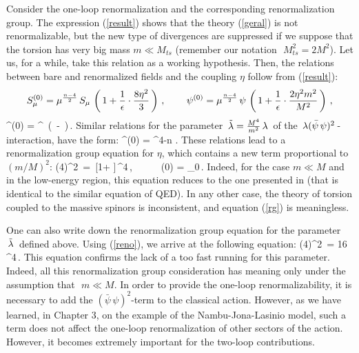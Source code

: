 Consider the one-loop renormalization and the corresponding
renormalization group. 
The expression (\ref{result}) shows that the theory (\ref{geral})
is not renormalizable, but the new type of divergences are 
suppressed if we suppose that the torsion has very big mass
$m \ll M_{ts}$ (remember our notation $\,\,M^2_{ts}=2M^2$). 
Let us, for a while, take this relation as a 
working hypothesis. Then, the relations between bare
and renormalized fields and the coupling $\eta$ follow from
(\ref{result}):
$$
S_\mu^{(0)} = \mu^{\frac{n-4}{2}}\,S_\mu\,
\left(\, 1 + \frac{1}{\epsilon}\cdot\frac{8\eta^2}{3}\,\right)
\,,\,\,\,\,\,\,\,\,\,\,\,\,\, \psi^{(0)} =
\mu^{\frac{n-4}{2}}\,\psi\, \left(\, 1 +
\frac{1}{\epsilon}\cdot\frac{2\eta^2m^2}{M^2}\,\right)\,,
$$
\beq
\eta^{(0)} = \mu^{}\, \left( \,\eta -
\cdot {}\cdot {}\,\right)\,. \label{renor}
\eeq
Similar
relations for the parameter $\,{\tilde {\lambda}} =
\frac{M^4}{m^2}\,\lambda\,$ of the $\,\lambda (\bar \psi\,\psi)^2\,$-
interaction, have the form: \beq {\tilde \la}^{(0)} =
\mu^{4-n}\,\,.
\label{reno}
\eeq
These relations lead to a renormalization group equation
for $\eta$, which contains a new term proportional to $(m / M)^2$:
\beq (4\pi)^2\, = \,[1+
]\,\eta^4\,,\,\,\,\,\,\,\,\, \,\,\,\,\,\, \eta(0) =
\eta_0\,. \label{rg} \eeq Indeed, for the case $m \ll M$ and in
the low-energy region, this equation reduces to the one presented
in \cite{betor} (that is identical to the similar equation of
QED). In any other case, the theory of torsion coupled to the
massive spinors is inconsistent, and equation (\ref{rg}) is 
meaningless.

One can also write down the renormalization group equation for the
parameter $\,{\tilde {\lambda}}\,$ defined above. Using (\ref{reno}), we
arrive at the following equation:
\beq
(4\pi)^2\, = 16\,\eta^4\,.
\label{psi4}
\eeq
This equation confirms the
lack of a too fast running for this parameter. Indeed, all this
renormalization group consideration has meaning only under the
assumption that $\,\,m \ll M$. In order to provide the one-loop 
renormalizability, it is necessary to add the 
$({\bar \psi}\,\psi)^2$-term to the classical action. However, as 
we have learned, in Chapter 3, on the example of the Nambu-Jona-Lasinio 
model, such a term does not 
affect the one-loop renormalization of other 
sectors of the action. However, it becomes extremely important 
for the two-loop contributions. 
\vskip 3mm


